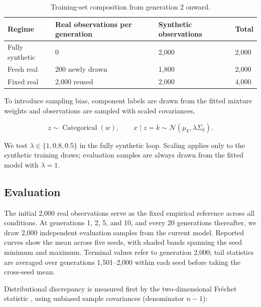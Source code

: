 \documentclass[11pt,a4paper]{article}
\begin{document}
\begin{table}[!htbp]\centering\small

\caption{Training-set composition from generation 2 onward.}

\begin{tabularx}{\linewidth}{@{}YYYY@{}}\toprule

\textbf{Regime} & \textbf{Real observations per generation} & \textbf{Synthetic observations} & \textbf{Total}\\\midrule

Fully synthetic & 0 & 2,000 & 2,000\\

Fresh real & 200 newly drawn & 1,800 & 2,000\\

Fixed real & 2,000 reused & 2,000 & 4,000\\

\bottomrule\end{tabularx}\end{table}

To introduce sampling bias, component labels are drawn from the fitted mixture weights and observations are sampled with scaled covariances,


\begin{equation}
z\sim\operatorname{Categorical}(w),\qquad x\mid z=k\sim\mathcal{N}(\mu_k,\lambda\Sigma_k).
\end{equation}

We test $\lambda\in\{1,0.8,0.5\}$ in the fully synthetic loop. Scaling applies only to the synthetic training draws; evaluation samples are always drawn from the fitted model with $\lambda=1$.


\FloatBarrier
\subsection{Evaluation}

The initial 2,000 real observations serve as the fixed empirical reference across all conditions. At generations 1, 2, 5, and 10, and every 20 generations thereafter, we draw 2,000 independent evaluation samples from the current model. Reported curves show the mean across five seeds, with shaded bands spanning the seed minimum and maximum. Terminal values refer to generation 2,000; tail statistics are averaged over generations 1,501--2,000 within each seed before taking the cross-seed mean.


Distributional discrepancy is measured first by the two-dimensional Fréchet statistic \cite{r2}, using unbiased sample covariances (denominator $n-1$):
\end{document}
